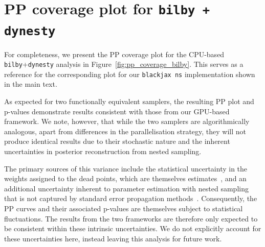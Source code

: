 \documentclass[fleqn,usenatbib]{mnras}
\begin{document}


\appendix


\section{PP coverage plot for \texttt{bilby + dynesty}}
\label{app:bilby_pp_plot}

For completeness, we present the PP coverage plot for the CPU-based
\texttt{bilby}+\texttt{dynesty} analysis in
Figure~\ref{fig:pp_coverage_bilby}. This serves as a reference for the
corresponding plot for our \texttt{blackjax ns} implementation shown in
the main text.

As expected for two functionally equivalent samplers, the resulting PP
plot and p-values demonstrate results consistent with
those from our GPU-based framework. We note, however, that while
the two samplers are algorithmically analogous, apart from differences
in the parallelisation strategy, they will not produce
identical results due to their stochastic nature and the inherent
uncertainties in posterior reconstruction from nested sampling.

The primary sources of this variance include the statistical
uncertainty in the weights assigned to the dead points, which are
themselves estimates~\citep{skilling, Higson_Errors}, and an additional
uncertainty inherent to parameter estimation with nested sampling that
is not captured by standard error propagation
methods~\citep{Prathaban_PE_errors}. Consequently, the PP curves and
their associated p-values are themselves subject to statistical
fluctuations. The results from the two frameworks are therefore only
expected to be consistent within these intrinsic uncertainties.
We do not explicitly account for these uncertainties
here, instead leaving this analysis for future work.
\end{document}
